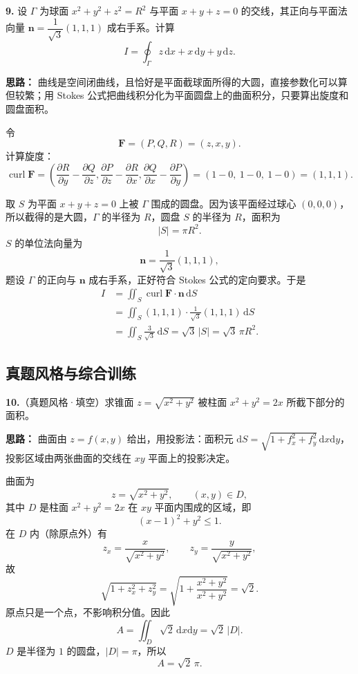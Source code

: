 \else \answerarea[10] \fi%

\textbf{9.} 设 $\Gamma$ 为球面 $x^2+y^2+z^2=R^2$ 与平面 $x+y+z=0$ 的交线，其正向与平面法向量 $\mathbf n=\dfrac{1}{\sqrt3}(1,1,1)$ 成右手系。计算
\[
I=\oint_\Gamma z\,\mathrm{d}x+x\,\mathrm{d}y+y\,\mathrm{d}z.
\]

\ifshowsolutions%
\textbf{思路：} 曲线是空间闭曲线，且恰好是平面截球面所得的大圆，直接参数化可以算但较繁；用 Stokes 公式把曲线积分化为平面圆盘上的曲面积分，只要算出旋度和圆盘面积。

令
\[
\mathbf F=(P,Q,R)=(z,x,y).
\]
计算旋度：
\[
\operatorname{curl}\mathbf F
=\left(
\frac{\partial R}{\partial y}-\frac{\partial Q}{\partial z},
\frac{\partial P}{\partial z}-\frac{\partial R}{\partial x},
\frac{\partial Q}{\partial x}-\frac{\partial P}{\partial y}
\right)
=(1-0,\ 1-0,\ 1-0)=(1,1,1).
\]

取 $S$ 为平面 $x+y+z=0$ 上被 $\Gamma$ 围成的圆盘。因为该平面经过球心 $(0,0,0)$，所以截得的是大圆，$\Gamma$ 的半径为 $R$，圆盘 $S$ 的半径为 $R$，面积为
\[
|S|=\pi R^2.
\]
$S$ 的单位法向量为
\[
\mathbf n=\frac{1}{\sqrt3}(1,1,1),
\]
题设 $\Gamma$ 的正向与 $\mathbf n$ 成右手系，正好符合 Stokes 公式的定向要求。于是
\[
\begin{aligned}
I
&=\iint_S \operatorname{curl}\mathbf F\cdot\mathbf n\,\mathrm{d}S\\
&=\iint_S (1,1,1)\cdot\frac{1}{\sqrt3}(1,1,1)\,\mathrm{d}S\\
&=\iint_S \frac{3}{\sqrt3}\,\mathrm{d}S
=\sqrt3\,|S|
=\sqrt3\,\pi R^2.
\end{aligned}
\]

\else \answerarea[10] \fi%

\subsection{真题风格与综合训练}

\textbf{10.}（真题风格·填空）求锥面 $z=\sqrt{x^2+y^2}$ 被柱面 $x^2+y^2=2x$ 所截下部分的面积。

\ifshowsolutions%
\textbf{思路：} 曲面由 $z=f(x,y)$ 给出，用投影法：面积元 $\mathrm{d}S=\sqrt{1+f_x^2+f_y^2}\,\mathrm{d}x\mathrm{d}y$，投影区域由两张曲面的交线在 $xy$ 平面上的投影决定。

曲面为
\[
z=\sqrt{x^2+y^2},\qquad (x,y)\in D,
\]
其中 $D$ 是柱面 $x^2+y^2=2x$ 在 $xy$ 平面内围成的区域，即
\[
(x-1)^2+y^2\le1.
\]
在 $D$ 内（除原点外）有
\[
z_x=\frac{x}{\sqrt{x^2+y^2}},\qquad
z_y=\frac{y}{\sqrt{x^2+y^2}},
\]
故
\[
\sqrt{1+z_x^2+z_y^2}
=\sqrt{1+\frac{x^2+y^2}{x^2+y^2}}
=\sqrt2.
\]
原点只是一个点，不影响积分值。因此
\[
A=\iint_D \sqrt2\,\mathrm{d}x\mathrm{d}y
=\sqrt2\,|D|.
\]
$D$ 是半径为 $1$ 的圆盘，$|D|=\pi$，所以
\[
A=\sqrt2\,\pi.
\]

